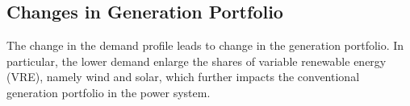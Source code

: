 \documentclass[energies,article,submit,moreauthors,pdftex]{Definitions/mdpi}
\begin{document}








\subsection{Changes in Generation Portfolio}\label{sec:Generation portfolio}
The change in the demand profile leads to change in the generation portfolio. In particular, the lower demand enlarge the shares of variable renewable energy (VRE), namely wind and solar, which further impacts the conventional generation portfolio in the power system. 
\end{document}
